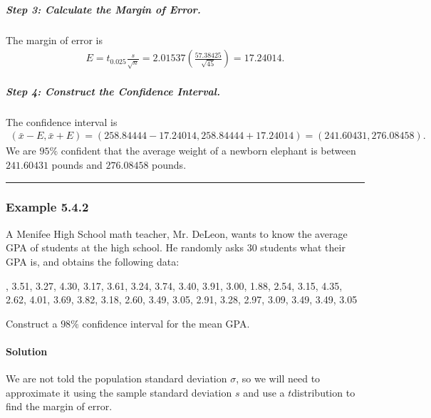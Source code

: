 \documentclass[letterpaper,10pt,english]{jupyterBook}
\begin{document}
\subparagraph{Step 3: Calculate the Margin of Error.}
\label{\detokenize{Ch5 Confidence Intervals/5.4 Estimating Population Means (Sigma Unknown):step-3-calculate-the-margin-of-error}}
\sphinxAtStartPar
The margin of error is
\begin{equation*}
\begin{split} E = t_{0.025}\frac{s}{\sqrt{n}} = 2.01537\left(\frac{57.38425}{\sqrt{45}}\right) = 17.24014. \end{split}
\end{equation*}

\subparagraph{Step 4: Construct the Confidence Interval.}
\label{\detokenize{Ch5 Confidence Intervals/5.4 Estimating Population Means (Sigma Unknown):step-4-construct-the-confidence-interval}}
\sphinxAtStartPar
The confidence interval is
\begin{equation*}
\begin{split}(\bar{x} - E, \bar{x} + E) = (258.84444 - 17.24014, 258.84444 + 17.24014) = (241.60431, 276.08458).\end{split}
\end{equation*}
\sphinxAtStartPar
We are \(95\%\) confident that the average weight of a newborn elephant is between \(241.60431\) pounds and \(276.08458\) pounds.


\bigskip\hrule\bigskip



\subsubsection{Example 5.4.2}
\label{\detokenize{Ch5 Confidence Intervals/5.4 Estimating Population Means (Sigma Unknown):example-5-4-2}}
\sphinxAtStartPar
A Menifee High School math teacher, Mr. DeLeon, wants to know the average GPA of students at the high school. He randomly asks \(30\) students what their GPA is, and obtains the following data:

, 3.51, 3.27, 4.30, 3.17, 3.61, 3.24, 3.74, 3.40, 3.91, 3.00, 1.88, 2.54, 3.15, 4.35, 2.62, 4.01, 3.69, 3.82, 3.18, 2.60, 3.49, 3.05, 2.91, 3.28, 2.97, 3.09, 3.49, 3.49, 3.05

\sphinxAtStartPar
Construct a \(98\%\) confidence interval for the mean GPA.


\paragraph{Solution}
\label{\detokenize{Ch5 Confidence Intervals/5.4 Estimating Population Means (Sigma Unknown):id1}}
\sphinxAtStartPar
We are not told the population standard deviation \(\sigma\), so we will need to approximate it using the sample standard deviation \(s\) and use a \(t\)\sphinxhyphen{}distribution to find the margin of error.
\end{document}
